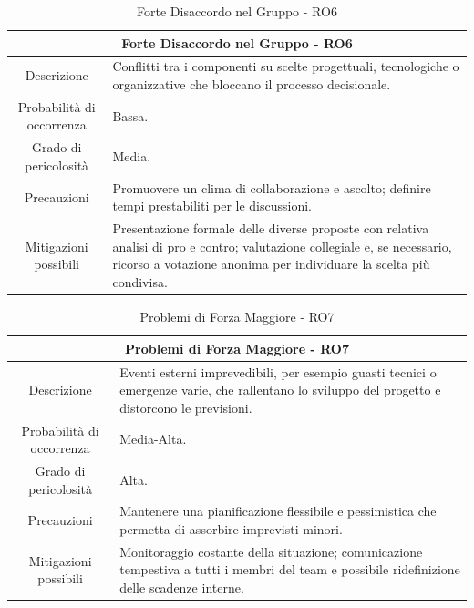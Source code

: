 \documentclass[12pt, a4paper]{article}
\begin{document}
\begin{table}[H]
    \centering
    \renewcommand{\arraystretch}{1.3}
    \begin{tabularx}{\textwidth}{|c|X|}
        \hline
        \multicolumn{2}{|c|}{\textbf{Forte Disaccordo nel Gruppo - RO6}} \\ \hline
        Descrizione & 
        Conflitti tra i 
componenti su scelte progettuali, tecnologiche o
        organizzative che bloccano il processo decisionale.
\\ \hline
        Probabilità di occorrenza & Bassa.
\\ \hline
        Grado di pericolosità & Media.
\\ \hline
        Precauzioni &
        Promuovere un clima di collaborazione e ascolto;
definire tempi
        prestabiliti per le discussioni.
\\ \hline
        Mitigazioni possibili & 
        Presentazione formale delle diverse proposte con relativa analisi di pro
        e contro;
valutazione collegiale e, se necessario, ricorso a votazione
        anonima per individuare la scelta più condivisa.\\ \hline
    \end{tabularx}
    \caption{Forte Disaccordo nel Gruppo - RO6}
\end{table}

\begin{table}[H]
    \centering
    \renewcommand{\arraystretch}{1.3}
    \begin{tabularx}{\textwidth}{|c|X|}
        \hline
        \multicolumn{2}{|c|}{\textbf{Problemi di Forza Maggiore - RO7}} \\ \hline
        Descrizione & 
        Eventi esterni imprevedibili, per esempio guasti tecnici o emergenze varie, che rallentano lo sviluppo del progetto e distorcono le previsioni.
\\ \hline
        Probabilità di occorrenza & Media-Alta.
\\ \hline
        Grado di pericolosità & Alta.
\\ \hline
        Precauzioni & 
        Mantenere una pianificazione flessibile e pessimistica che permetta di
        assorbire imprevisti minori.
\\ \hline
        Mitigazioni possibili &
        Monitoraggio costante della situazione;
comunicazione tempestiva a tutti
        i membri del team e possibile ridefinizione delle scadenze interne.
\\ \hline
    \end{tabularx}
    \caption{Problemi di Forza Maggiore - RO7}
\end{table}
\end{document}
